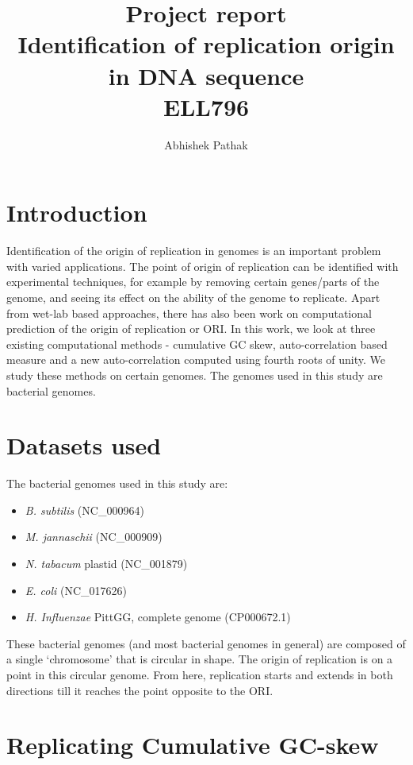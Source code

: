\documentclass[10pt]{article}
\title{\textbf{Project report\\Identification of replication origin in DNA sequence\\ELL796}}
\author{Abhishek Pathak}
\date{}
\begin{document}
\maketitle

\section{Introduction}

Identification of the origin of replication in genomes is an important problem with varied applications. The point of origin of replication can be identified with experimental techniques, for example by removing certain genes/parts of the genome, and seeing its effect on the ability of the genome to replicate. Apart from wet-lab based approaches, there has also been work on computational prediction of the origin of replication or ORI. In this work, we look at three existing computational methods - cumulative GC skew, auto-correlation based measure and a new auto-correlation computed using fourth roots of unity. We study these methods on certain genomes. The genomes used in this study are bacterial genomes.

\section{Datasets used}

The bacterial genomes used in this study are:

\begin{itemize}
\item \textit{B. subtilis} (NC\_000964)
\item \textit{M. jannaschii} (NC\_000909)
\item \textit{N. tabacum} plastid (NC\_001879)
\item \textit{E. coli} (NC\_017626)
\item \textit{H. Influenzae} PittGG, complete genome (CP000672.1)
\end{itemize}

These bacterial genomes (and most bacterial genomes in general) are composed of a single `chromosome' that is circular in shape. The origin of replication is on a point in this circular genome. From here, replication starts and extends in both directions till it reaches the point opposite to the ORI.

\section{Replicating Cumulative GC-skew}
\end{document}
